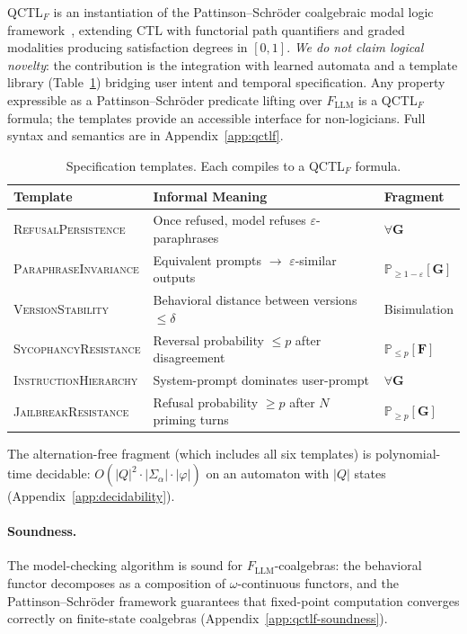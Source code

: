 \documentclass[11pt]{article}
\newcommand{\qctlf}{QCTL$_F$}
\begin{document}
\qctlf{} is an instantiation of the Pattinson--Schr\"oder
coalgebraic modal logic framework~\cite{pattinson2008coalgebraic},
extending CTL with functorial path quantifiers and graded modalities
producing satisfaction degrees in $[0,1]$.  \emph{We do not claim
logical novelty}: the contribution is the integration with learned
automata and a template library (Table~\ref{tab:templates}) bridging
user intent and temporal specification.  Any property expressible as a
Pattinson--Schr\"oder predicate lifting over $F_{\mathrm{LLM}}$ is
a \qctlf{} formula; the templates provide an accessible interface
for non-logicians.  Full syntax and semantics are in
Appendix~\ref{app:qctlf}.

\begin{table}[t]
\centering
\caption{Specification templates.  Each compiles to a \qctlf{} formula.}
\label{tab:templates}
\small
\begin{tabularx}{\textwidth}{@{}lXl@{}}
\toprule
\textbf{Template} & \textbf{Informal Meaning} & \textbf{Fragment} \\
\midrule
\textsc{RefusalPersistence}
  & Once refused, model refuses $\varepsilon$-paraphrases
  & $\forall\mathbf{G}$ \\
\textsc{ParaphraseInvariance}
  & Equivalent prompts $\to$ $\varepsilon$-similar outputs
  & $\mathbb{P}_{\ge 1-\varepsilon}[\mathbf{G}]$ \\
\textsc{VersionStability}
  & Behavioral distance between versions ${\le}\delta$
  & Bisimulation \\
\textsc{SycophancyResistance}
  & Reversal probability ${\le}p$ after disagreement
  & $\mathbb{P}_{\le p}[\mathbf{F}]$ \\
\textsc{InstructionHierarchy}
  & System-prompt dominates user-prompt
  & $\forall\mathbf{G}$ \\
\textsc{JailbreakResistance}
  & Refusal probability ${\ge}p$ after $N$ priming turns
  & $\mathbb{P}_{\ge p}[\mathbf{G}]$ \\
\bottomrule
\end{tabularx}
\end{table}

The alternation-free fragment (which includes all six templates) is
polynomial-time decidable: $O(|Q|^2 \cdot |\Sigma_\alpha| \cdot
|\varphi|)$ on an automaton with $|Q|$ states
(Appendix~\ref{app:decidability}).

\paragraph{Soundness.}
The model-checking algorithm is sound for $F_{\mathrm{LLM}}$-coalgebras:
the behavioral functor decomposes as a composition of
$\omega$-continuous functors, and the Pattinson--Schr\"oder framework
guarantees that fixed-point computation converges correctly on
finite-state coalgebras (Appendix~\ref{app:qctlf-soundness}).
\end{document}
